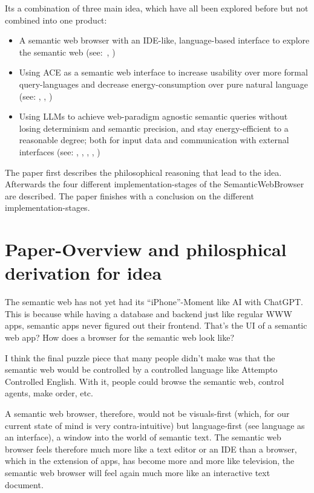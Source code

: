 \documentclass[12pt,a4paper]{article}
\begin{document}
Its a combination of three main idea, which have all been explored before but not combined into one product:

\begin{itemize}
    \item A semantic web browser with an IDE-like, language-based interface to explore the semantic web (see:~\cite{semanticWebBrowser}, \cite{headlessBrowsers})
    \item Using ACE as a semantic web interface to increase usability over more formal query-languages and decrease energy-consumption over pure natural language (see: \cite{semanticWebLanguageBased}, \cite{semanticWebControlledEnglish}, \cite{semanticWebAce})
    \item Using LLMs to achieve web-paradigm agnostic semantic queries without losing determinism and semantic precision, and stay energy-efficient to a reasonable degree; both for input data and communication with external interfaces (see: \cite{llmAsDataTranslator}, \cite{llmForIntegratingHeterogenousData}, \cite{neuroSymbolicAi}, \cite{domainDiscoveryTool}, \cite{schemaInference})
\end{itemize}

The paper first describes the philosophical reasoning that lead to the idea.
Afterwards the four different implementation-stages of the SemanticWebBrowser are described.
The paper finishes with a conclusion on the different implementation-stages.

\section{Paper-Overview and philosphical derivation for idea}

The semantic web has not yet had its ``iPhone''-Moment like AI with ChatGPT. This is because while having a database and backend just like regular WWW apps, semantic apps never figured out their frontend. That's the UI of a semantic web app? How does a browser for the semantic web look like?

I think the final puzzle piece that many people didn't make was that the semantic web would be controlled by a controlled language like Attempto Controlled English. With it, people could browse the semantic web, control agents, make order, etc.

A semantic web browser, therefore, would not be visuals-first (which, for our current state of mind is very contra-intuitive) but language-first (see language as an interface), a window into the world of semantic text. The semantic web browser feels therefore much more like a text editor or an IDE than a browser, which in the extension of apps, has become more and more like television, the semantic web browser will feel again much more like an interactive text document.
\end{document}
